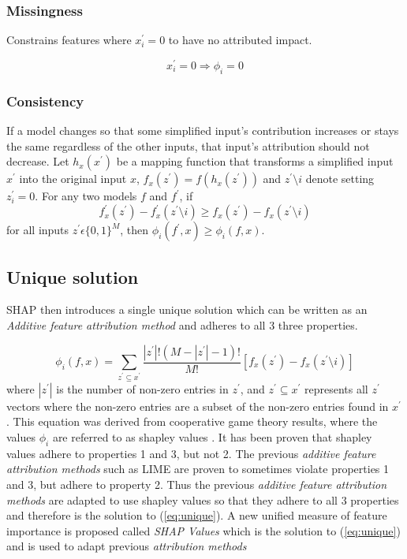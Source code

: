 \subsubsection{Missingness}
Constrains features where $x^{'}_{i}= 0$ to have no attributed impact. 

\begin{equation}
x^{'}_{i} = 0 \Longrightarrow \phi_{i} = 0
\label{eq:missingness}
\end{equation}


\subsubsection{Consistency}
 If a model changes so that some simplified input’s contribution increases or stays the same regardless of the other inputs, that input’s attribution should not decrease. Let $h_x(x^{'})$ be a mapping function that transforms a simplified input $x^{'}$ into the original input $x$, $f_{x}(z^{'}) = f(h_{x}(z^{'}))$ and $z^{'} \setminus i$ denote setting $z_{i}^{'} = 0$. For any two models $f$ and $f^{'}$, if
 \begin{equation}
    f^{'}_{x}(z^{'}) - f^{'}_{x}(z^{'} \setminus i) \geq f_{x}(z^{'}) -  f_{x}(z^{'} \setminus i)
    \label{eq:consistency}
 \end{equation}
 for all inputs $z^{'} \epsilon\{0, 1\}^{M}$, then $\phi_{i}(f^{'}, x) \geq \phi_{i}(f, x)$.
 
 \subsection{Unique solution}
 
SHAP then introduces a single unique solution which can be written as an  \emph{Additive feature attribution method} and adheres to all 3 three properties.

\begin{equation}
    \phi_{i}(f, x) = \sum\limits_{z^{'} \subseteq x^{'}} \frac{|z^{'}|!(M - |z^{'}| - 1)!}{M!}[f_{x}(z^{'}) - f_{x}(z^{'} \setminus i)]    
    \label{eq:unique}
\end{equation}
where $|z^{'}|$ is the number of non-zero entries in $z^{'}$, and $z^{'} \subseteq x^{'}$ represents all $z^{'}$ vectors where the non-zero entries are a subset of the non-zero entries found in $x^{'}$.
This equation was derived from cooperative game theory results, where the values $\phi_{i}$ are referred to as shapley values \cite{shapley1952value}. It has been proven that shapley values adhere to properties 1 and 3, but not 2. The previous \emph{additive feature attribution methods} such as LIME are proven to sometimes violate properties 1 and 3, but adhere to property 2. Thus the previous \emph{additive feature attribution methods} are adapted to use shapley values so that they adhere to all 3 properties and therefore is the solution to (\ref{eq:unique}). A new unified measure of feature importance is proposed called \emph{SHAP Values}  \cite{NIPS2017_7062} which is the solution to (\ref{eq:unique}) and is used to adapt previous \emph{attribution methods}

